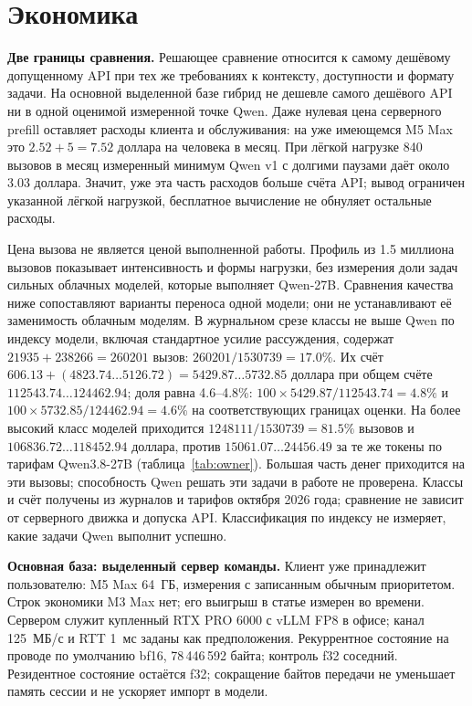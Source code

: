 \section{Экономика}
\label{sec:economics}

\textbf{Две границы сравнения.} Решающее сравнение относится к самому дешёвому допущенному API
при тех же требованиях к контексту, доступности и формату задачи. На основной выделенной базе гибрид
не дешевле самого дешёвого API ни в одной оценимой измеренной точке Qwen.
Даже нулевая цена серверного prefill оставляет расходы клиента и обслуживания:
на уже имеющемся M5 Max это $2.52+5=7.52$ доллара на человека в месяц.
При лёгкой нагрузке 840 вызовов в месяц измеренный минимум Qwen v1 с долгими паузами даёт
около 3.03 доллара. Значит, уже эта часть расходов больше счёта API;
вывод ограничен указанной лёгкой нагрузкой, бесплатное вычисление не обнуляет остальные расходы.

Цена вызова не является ценой выполненной работы. Профиль из 1.5 миллиона вызовов показывает интенсивность
и формы нагрузки, без измерения доли задач сильных облачных моделей, которые выполняет Qwen-27B.
Сравнения качества ниже сопоставляют варианты переноса одной модели; они не устанавливают её заменимость облачным моделям.
В журнальном срезе классы не выше Qwen по индексу модели, включая стандартное усилие рассуждения,
содержат $21935+238266=260201$ вызов: $260201/1530739=17.0\%$.
Их счёт $606.13+(4823.74\ldots5126.72)=5429.87\ldots5732.85$ доллара
при общем счёте $112543.74\ldots124462.94$; доля равна 4.6--4.8\%:
$100\times5429.87/112543.74=4.8\%$ и $100\times5732.85/124462.94=4.6\%$ на соответствующих границах оценки.
На более высокий класс моделей приходится $1248111/1530739=81.5\%$ вызовов и
$106836.72\ldots118452.94$ доллара, против $15061.07\ldots24456.49$ за те же токены
по тарифам Qwen3.8-27B (таблица~\ref{tab:owner}). Большая часть денег приходится на эти вызовы;
способность Qwen решать эти задачи в работе не проверена. Классы и счёт получены из журналов
и тарифов октября 2026 года; сравнение не зависит от серверного движка и допуска API.
Классификация по индексу не измеряет, какие задачи Qwen выполнит успешно.

\textbf{Основная база: выделенный сервер команды.} Клиент уже принадлежит пользователю: M5 Max 64~ГБ,
измерения с записанным обычным приоритетом. Строк экономики M3 Max нет; его выигрыш в статье измерен во времени.
Сервером служит купленный RTX PRO 6000 с vLLM FP8 в офисе; канал 125~МБ/с и RTT 1~мс заданы как предположения.
Рекуррентное состояние на проводе по умолчанию bf16, 78\,446\,592 байта; контроль f32 соседний.
Резидентное состояние остаётся f32; сокращение байтов передачи не уменьшает память сессии и не ускоряет импорт в модели.

